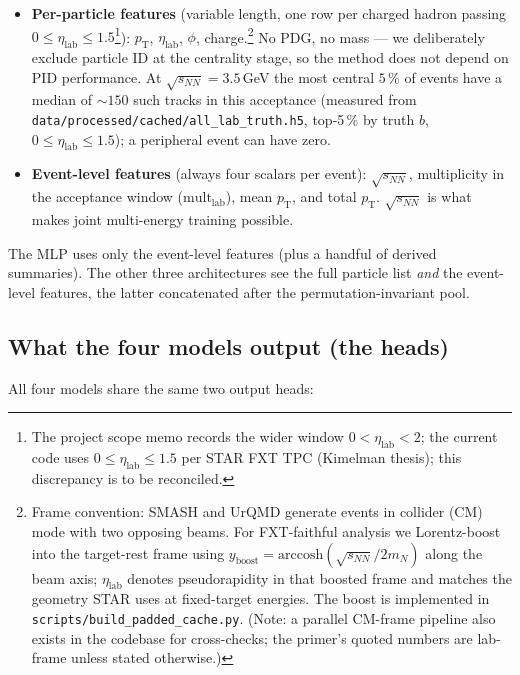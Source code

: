 \documentclass[11pt]{article}
\newcommand{\sqsnn}{\ensuremath{\sqrt{s_{NN}}}}
\newcommand{\pT}{\ensuremath{p_{\text{T}}}}
\newcommand{\etalab}{\ensuremath{\eta_{\text{lab}}}}
\begin{document}
\begin{itemize}[leftmargin=*]
\item \textbf{Per-particle features} (variable length, one row per
      charged hadron passing $0 \le \etalab \le 1.5$\footnote{The
      project scope memo records the wider window
      $0<\etalab<2$; the current code uses $0\le\etalab\le 1.5$ per
      STAR FXT TPC (Kimelman thesis); this discrepancy is to be
      reconciled.}):
      $\pT$, $\etalab$, $\phi$, charge.\footnote{Frame convention:
      SMASH and UrQMD generate events in collider (CM) mode with two
      opposing beams. For FXT-faithful analysis we Lorentz-boost into
      the target-rest frame using $y_{\text{boost}} =
      \mathrm{arccosh}(\sqsnn / 2 m_N)$ along the beam axis; $\etalab$
      denotes pseudorapidity in that boosted frame and matches the
      geometry STAR uses at fixed-target energies. The boost is
      implemented in \texttt{scripts/build\_padded\_cache.py}. (Note:
      a parallel CM-frame pipeline also exists in the codebase for
      cross-checks; the primer's quoted numbers are lab-frame unless
      stated otherwise.)}
      No PDG, no mass --- we deliberately exclude particle ID at the
      centrality stage, so the method does not depend on PID
      performance. At $\sqsnn=3.5$\,GeV the most central $5\,\%$ of
      events have a median of $\sim 150$ such tracks in this
      acceptance (measured from
      \texttt{data/processed/cached/all\_lab\_truth.h5}, top-5\,\% by
      truth $b$, $0\le\etalab\le 1.5$); a peripheral event can have
      zero.
\item \textbf{Event-level features} (always four scalars per event):
      $\sqsnn$, multiplicity in the acceptance window
      ($\text{mult}_{\text{lab}}$), mean $\pT$, and total $\pT$.
      $\sqsnn$ is what makes joint multi-energy training possible.
\end{itemize}

The MLP uses only the event-level features (plus a handful of derived
summaries). The other three architectures see the full particle list
\emph{and} the event-level features, the latter concatenated after the
permutation-invariant pool.

\subsection{What the four models output (the heads)}

All four models share the same two output heads:
\end{document}

